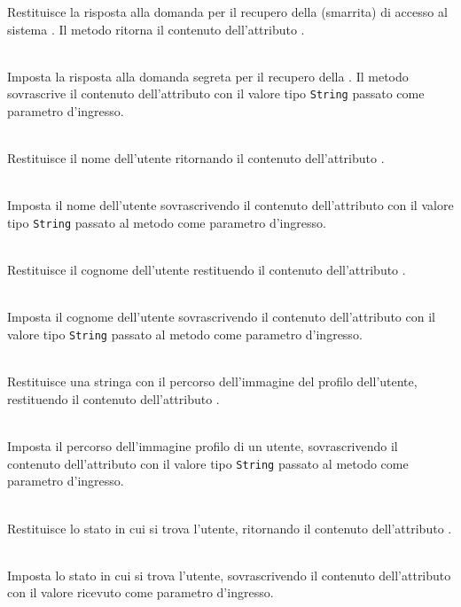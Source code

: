 \begin{description}
	Restituisce la risposta alla domanda per il recupero della  (smarrita) di accesso al sistema \caName. Il metodo ritorna il contenuto dell'attributo .
	\item{}\\
	Imposta la risposta alla domanda segreta per il recupero della . Il metodo sovrascrive il contenuto dell'attributo  con il valore tipo \texttt{String} passato come parametro d'ingresso.
	\item{}\\
	Restituisce il nome dell'utente ritornando il contenuto dell'attributo .
	\item{}\\
	Imposta il nome dell'utente sovrascrivendo il contenuto dell'attributo  con il valore tipo \texttt{String} passato al metodo come parametro d'ingresso.
	\item{}\\
	Restituisce il cognome dell'utente restituendo il contenuto dell'attributo .
	\item{}\\
	Imposta il cognome dell'utente sovrascrivendo il contenuto dell'attributo  con il valore tipo \texttt{String} passato al metodo come parametro d'ingresso.
	\item{}\\
	Restituisce una stringa con il percorso dell'immagine del profilo dell'utente, restituendo il contenuto dell'attributo .
	\item{}\\
	Imposta il percorso dell'immagine profilo di un utente, sovrascrivendo il contenuto dell'attributo  con il valore tipo \texttt{String} passato al metodo come parametro d'ingresso.
	\item{}\\
	Restituisce lo stato in cui si trova l'utente, ritornando il contenuto dell'attributo .
	\item{}\\
	Imposta lo stato in cui si trova l'utente, sovrascrivendo il contenuto dell'attributo  con il valore ricevuto come parametro d'ingresso.

\end{description}
